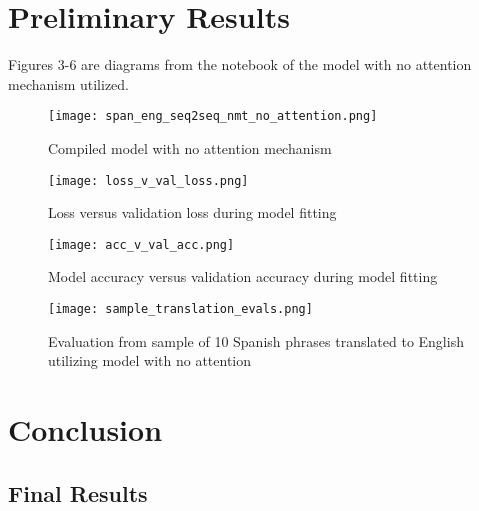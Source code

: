 \documentclass[conference]{IEEEtran}
\begin{document}
\section{Preliminary Results}
Figures $3$-$6$ are diagrams from the notebook of the model with no attention mechanism utilized.
\begin{figure}[h]
    \centering
    \texttt{[image: span\_eng\_seq2seq\_nmt\_no\_attention.png]}
    \caption{Compiled model with no attention mechanism}
\end{figure}
\begin{figure}[h]
    \centering
    \texttt{[image: loss\_v\_val\_loss.png]}
    \caption{Loss versus validation loss during model fitting}
\end{figure}
\begin{figure}[h]
    \centering
    \texttt{[image: acc\_v\_val\_acc.png]}
    \caption{Model accuracy versus validation accuracy during model fitting}
\end{figure}
\begin{figure}[h]
    \centering
    \texttt{[image: sample\_translation\_evals.png]}
    \caption{Evaluation from sample of 10 Spanish phrases translated to English utilizing model with no attention}
\end{figure}

\section{Conclusion}
\subsection{Final Results}
\subsection{}
\medskip
\end{document}
